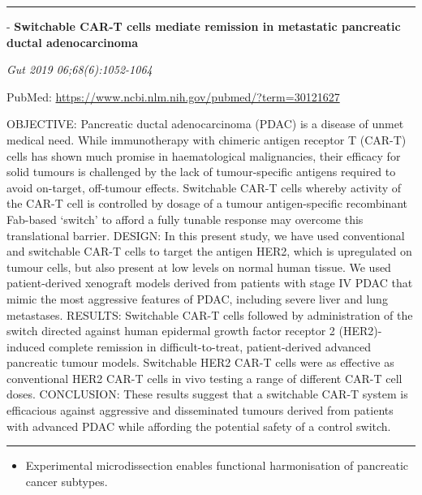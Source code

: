 \documentclass[]{article}
\providecommand{\tightlist}{%
  \setlength{\itemsep}{0pt}\setlength{\parskip}{0pt}}
\begin{document}
{}

{}

\begin{center}\rule{0.5\linewidth}{\linethickness}\end{center}

 - \textbf{Switchable CAR-T cells mediate remission in metastatic
pancreatic ductal adenocarcinoma}

\emph{Gut 2019 06;68(6):1052-1064}

PubMed: \url{https://www.ncbi.nlm.nih.gov/pubmed/?term=30121627}

OBJECTIVE: Pancreatic ductal adenocarcinoma (PDAC) is a disease of unmet
medical need. While immunotherapy with chimeric antigen receptor T
(CAR-T) cells has shown much promise in haematological malignancies,
their efficacy for solid tumours is challenged by the lack of
tumour-specific antigens required to avoid on-target, off-tumour
effects. Switchable CAR-T cells whereby activity of the CAR-T cell is
controlled by dosage of a tumour antigen-specific recombinant Fab-based
`switch' to afford a fully tunable response may overcome this
translational barrier. DESIGN: In this present study, we have used
conventional and switchable CAR-T cells to target the antigen HER2,
which is upregulated on tumour cells, but also present at low levels on
normal human tissue. We used patient-derived xenograft models derived
from patients with stage IV PDAC that mimic the most aggressive features
of PDAC, including severe liver and lung metastases. RESULTS: Switchable
CAR-T cells followed by administration of the switch directed against
human epidermal growth factor receptor 2 (HER2)-induced complete
remission in difficult-to-treat, patient-derived advanced pancreatic
tumour models. Switchable HER2 CAR-T cells were as effective as
conventional HER2 CAR-T cells in vivo testing a range of different CAR-T
cell doses. CONCLUSION: These results suggest that a switchable CAR-T
system is efficacious against aggressive and disseminated tumours
derived from patients with advanced PDAC while affording the potential
safety of a control switch.

{}

{}

\begin{center}\rule{0.5\linewidth}{\linethickness}\end{center}

\begin{itemize}
\tightlist
\item
  Experimental microdissection enables functional harmonisation of
  pancreatic cancer subtypes.
\end{itemize}
\end{document}
